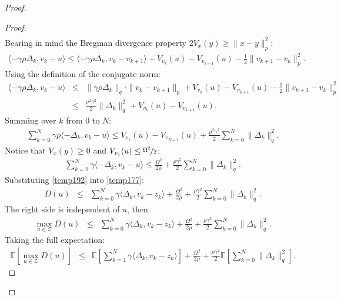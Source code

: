 \documentclass[runningheads]{llncs}
\begin{document}
\begin{proof}
\begin{proof}
\begin{eqnarray*}
\end{eqnarray*}
Bearing in mind the Bregman divergence property $2V_x(y) \geq \|x-y\|_p^2$:
\begin{eqnarray*}
    \langle -\gamma \rho\Delta_k, v_k  - u \rangle \leq \langle -\gamma \rho\Delta_k, v_k - v_{k+1} \rangle + V_{v_k}(u) -  V_{v_{k+1}}(u) - \frac{1}{2}\|v_{k+1} - v_k\|_p^2.
\end{eqnarray*}
Using the definition of the conjugate norm:
\begin{eqnarray*}
    \langle -\gamma \rho\Delta_k, v_k  - u \rangle &\leq& \|\gamma \rho\Delta_k\|_q\cdot\| v_k - v_{k+1} \|_p + V_{v_k}(u) -  V_{v_{k+1}}(u) - \frac{1}{2}\|v_{k+1} - v_k\|_p^2 \nonumber\\ 
    &\leq& \frac{\rho^2 \gamma^2}{2}\|\Delta_k\|_q^2 + V_{v_k}(u) -  V_{v_{k+1}}(u).
\end{eqnarray*}
Summing over $k$ from $0$ to $N$:
\begin{eqnarray*}
    \sum\limits_{k=0}^N \gamma \rho \langle -\Delta_k,  v_k - u \rangle \leq V_{v_1}(u) -  V_{v_{N+1}}(u) + \frac{\rho^2\gamma^2}{2}\sum\limits_{k=0}^N \|\Delta_k\|_q^2.
\end{eqnarray*}
Notice that $V_x(y) \geq 0$ and $V_{v_1}(u) \leq \nicefrac{\Omega^2}{2}$:
\begin{eqnarray}
\label{temp192}
    \sum\limits_{k=0}^N \gamma \langle -\Delta_k,  v_k - u \rangle \leq \frac{\Omega^2}{2\rho} + \frac{\rho \gamma^2}{2}\sum\limits_{k=0}^N \|\Delta_k\|_q^2.
\end{eqnarray}
Substituting \eqref{temp192} into \eqref{temp177}:
\begin{eqnarray*}
     D(u) &\leq& \sum\limits_{k=0}^N \gamma \langle \Delta_k, v_k - z_k  \rangle +
    \frac{\Omega^2}{2\rho} + \frac{\rho \gamma^2}{2}\sum\limits_{k=0}^N \|\Delta_k\|_q^2.  
\end{eqnarray*}
The right side is independent of $u$, then
\begin{eqnarray}
    \label{5t5}
     \max_{u \in \mathcal{Z}} D(u) &\leq& \sum\limits_{k=0}^N \gamma \langle \Delta_k, v_k - z_k  \rangle + 
    \frac{\Omega^2}{2\rho} + \frac{\rho \gamma^2}{2}\sum\limits_{k=0}^N \|\Delta_k\|_q^2.  
\end{eqnarray}
Taking the full expectation:
\begin{eqnarray*}
    \mathbb{E}\left[\max_{u \in \mathcal{Z}} D(u)\right] &\leq& \mathbb{E}\left[\sum\limits_{k=1}^N \gamma \langle \Delta_k, v_k - z_k \rangle\right] + 
    \frac{\Omega^2}{2\rho} + \frac{\rho \gamma^2}{2}\mathbb{E}\left[\sum\limits_{k=0}^N \|\Delta_k\|_q^2\right].  

\end{eqnarray*}
\end{proof}
\end{proof}
\end{document}
